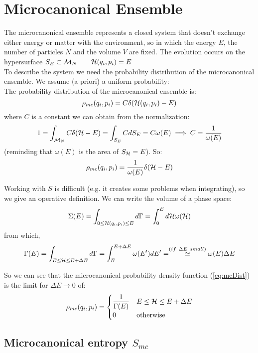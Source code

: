 \section{Microcanonical Ensemble}
The microcanonical ensemble represents a closed system that doesn't exchange either energy or matter with the environment, so in which the energy $E$, the number of particles $N$ and the volume $V$ are fixed. The evolution occurs on the hypersurface $S_E \subset \mathcal{M}_N \qquad \mathcal{H} (q_i,p_i) = E$\\

To describe the system we need the probability distribution of the microcanonical ensemble. We assume (a priori) a uniform probability:\\

\Def The probability distribution of the microcanonical ensemble is:
$$ \rho_{mc} (q_i,p_i) = C \delta (\mathcal{H}(q_i,p_i) - E)$$
where $C$ is a constant we can obtain from the normalization:
$$ 1 = \int_{\mathcal{M}_N} C\delta (\mathcal{H} - E) = \int_{S_E} CdS_E = C\omega(E) \implies C = \frac 1{\omega(E)}$$
(reminding that $\omega(E)$ is the area of $S_{\mathcal{H}} = E$). So:
\begin{equation} \label{eq:mcDist}
\rho_{mc} (q_i,p_i) = \frac 1{\omega(E)} \delta (\mathcal{H}- E)
\end{equation}

Working with $S$ is difficult (e.g. it creates some problems when integrating), so we give an operative definition. We can write the volume of a phase space:
$$\Sigma(E) = \int_{0 \le \mathcal{H}(q_i,p_i) \le E} d\Gamma = \int_0^E d\mathcal{H}\omega(\mathcal{H})$$
from which,
$$ \Gamma(E) = \int _{E \le \ham \le E+\Delta E} d\Gamma = \int_E^{E+\Delta E} \omega(E') dE' = \stackrel{(if\ \Delta E\ small)}{\simeq}\omega(E)\Delta E $$

So we can see that the microcanonical probability density function (\ref{eq:mcDist}) is the limit for $\Delta E \to 0$ of:
$$ \rho_{mc} (q_i,p_i) = \begin{cases}
    \dfrac 1{\Gamma(E)} & E \le \mathcal{H} \le E+\Delta E \\ 
    0 & \text{otherwise}
    \end{cases}
$$

\subsection{Microcanonical entropy \texorpdfstring{$S_{mc}$}{}}

